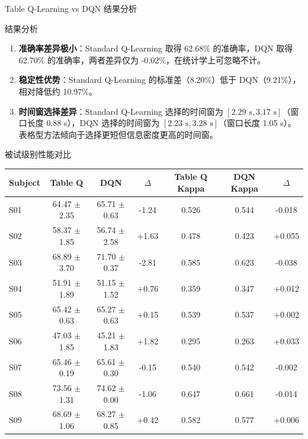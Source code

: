 {\begin{frame}{Table Q-Learning vs DQN 结果分析}
    \vspace{0.2cm}
    \begin{block}{结果分析}
        \footnotesize
        \begin{enumerate}
            \item \textbf{准确率差异极小}：Standard Q-Learning 取得 62.68\% 的准确率，DQN 取得 62.70\% 的准确率，两者差异仅为 -0.02\%，在统计学上可忽略不计。
            \item \textbf{稳定性优势}：Standard Q-Learning 的标准差（8.20\%）低于 DQN（9.21\%），相对降低约 10.97\%。
            \item \textbf{时间窗选择差异}：Standard Q-Learning 选择的时间窗为 $[2.29\text{ s}, 3.17\text{ s}]$（窗口长度 0.88 s），DQN 选择的时间窗为 $[2.23\text{ s}, 3.28\text{ s}]$（窗口长度 1.05 s）。表格型方法倾向于选择更短但信息密度更高的时间窗。
        \end{enumerate}
    \end{block}
\end{frame}

\begin{frame}{被试级别性能对比}
    \footnotesize
    \renewcommand{\arraystretch}{1.1}
    \begin{tabular}{lcccccc}
        \hline
        \textbf{Subject} & \textbf{Table Q} & \textbf{DQN} & \textbf{$\Delta$} & \textbf{Table Q Kappa} & \textbf{DQN Kappa} & \textbf{$\Delta$} \\
        \hline
        S01 & 64.47 $\pm$ 2.35 & 65.71 $\pm$ 0.63 & -1.24 & 0.526 & 0.544 & -0.018 \\
        S02 & 58.37 $\pm$ 1.85 & 56.74 $\pm$ 2.58 & +1.63 & 0.478 & 0.423 & +0.055 \\
        S03 & 68.89 $\pm$ 3.70 & 71.70 $\pm$ 0.37 & -2.81 & 0.585 & 0.623 & -0.038 \\
        S04 & 51.91 $\pm$ 1.89 & 51.15 $\pm$ 1.52 & +0.76 & 0.359 & 0.347 & +0.012 \\
        S05 & 65.42 $\pm$ 0.63 & 65.27 $\pm$ 0.63 & +0.15 & 0.539 & 0.537 & +0.002 \\
        S06 & 47.03 $\pm$ 1.85 & 45.21 $\pm$ 1.83 & +1.82 & 0.295 & 0.263 & +0.033 \\
        S07 & 65.46 $\pm$ 0.19 & 65.61 $\pm$ 0.30 & -0.15 & 0.540 & 0.542 & -0.002 \\
        S08 & 73.56 $\pm$ 1.31 & 74.62 $\pm$ 0.00 & -1.06 & 0.647 & 0.661 & -0.014 \\
        S09 & 68.69 $\pm$ 1.06 & 68.27 $\pm$ 0.85 & +0.42 & 0.582 & 0.577 & +0.006 \\
        \hline
    \end{tabular}
\end{frame}

}
